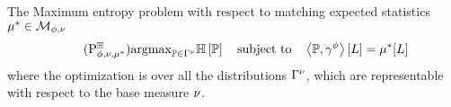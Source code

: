




\label{sec:maxEntDuality}


The Maximum entropy problem with respect to matching expected statistics $\mu^*\in\mathcal{M}_{\phi,\nu}$ 
\begin{align}\tag{$\probtagtypeinst{\entropysymbol}{\sstat,\basemeasure,\genmean}$}\label{prob:maxEntropy}
	\argmax_{\probtensor\in\Gamma^{\basemeasure}} \sentropyof{\probtensor} \quad \text{subject to} \quad 
	 \sbcontractionof{\probtensor,\sencsstat}{\selvariable} =  \genmeanat{\selvariable}
\end{align}
where the optimization is over all the distributions $\Gamma^{\nu}$, which are representable with respect to the base measure $\nu$.

